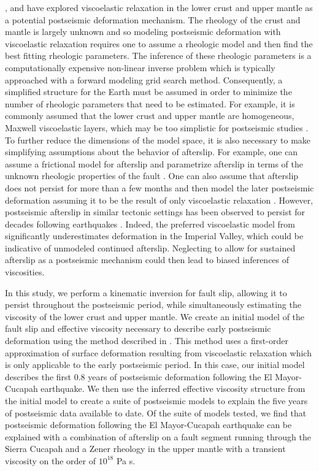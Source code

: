 \documentclass[draft,linenumbers]{AGUJournal}
\begin{document}
\citet{Pollitz2012}, \citet{Rollins2015} and \citet{Spinler2015} have explored viscoelastic relaxation in the lower crust and upper mantle as a potential postseismic deformation mechanism. The rheology of the crust and mantle is largely unknown and so modeling postseismic deformation with viscoelastic relaxation requires one to assume a rheologic model and then find the best fitting rheologic parameters.  The inference of these rheologic parameters is a computationally expensive non-linear inverse problem which is typically approached with a forward modeling grid search method.  Consequently, a simplified structure for the Earth must be assumed in order to minimize the number of rheologic parameters that need to be estimated.  For example, it is commonly assumed that the lower crust and upper mantle are homogeneous, Maxwell viscoelastic layers, which may be too simplistic for postseismic studies  \citep{Riva2009,Hines2013}. To further reduce the dimensions of the model space, it is also necessary to make simplifying assumptions about the behavior of afterslip. For example, one can assume a frictional model for afterslip and parametrize afterslip in terms of the unknown rheologic properties of the fault \citep[e.g.][]{Johnson2009,Johnson2004}. One can also assume that afterslip does not persist for more than a few months and then model the later postseismic deformation assuming it to be the result of only viscoelastic relaxation \citep[e.g.][]{Pollitz2012,Spinler2015}. However, postseismic afterslip in similar tectonic settings has been observed to persist for decades following earthquakes \citep{Cakir2012,Cetin2014}. Indeed, the preferred viscoelastic model from \citet{Pollitz2012} significantly underestimates deformation in the Imperial Valley, which could be indicative of unmodeled continued afterslip.  Neglecting to allow for sustained afterslip as a postseismic mechanism could then lead to biased inferences of viscosities. 

In this study, we perform a kinematic inversion for fault slip, allowing it to persist throughout the postseismic period, while simultaneously estimating the viscosity of the lower crust and upper mantle.  We create an initial model of the fault slip and effective viscosity necessary to describe early postseismic deformation using the method described in \citet{Hines2016}.  This method uses a first-order approximation of surface deformation resulting from viscoelastic relaxation which is only applicable to the early postseismic period. In this case, our initial model describes the first 0.8 years of postseismic deformation following the El Mayor-Cucapah earthquake.  We then use the inferred effective viscosity structure from the initial model to create a suite of postseismic models to explain the five years of postseismic data available to date.  Of the suite of models tested, we find that postseismic deformation following the El Mayor-Cucapah earthquake can be explained with a combination of afterslip on a fault segment running through the Sierra Cucapah and a Zener rheology in the upper mantle with a transient viscosity on the order of $10^{18}$ Pa s. 
\end{document}

